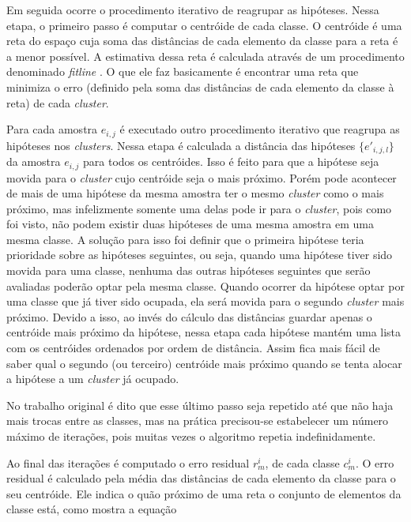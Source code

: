Em seguida ocorre o procedimento iterativo de reagrupar as hipóteses. Nessa etapa, o primeiro passo é computar o centróide de cada classe. O centróide é uma reta do espaço cuja soma das distâncias de cada elemento da classe para a reta é a menor possível. A estimativa dessa reta é calculada através de um procedimento denominado \emph{fitline} \cite{fitline_doc}. O que ele faz basicamente é encontrar uma reta que minimiza o erro (definido pela soma das distâncias de cada elemento da classe à reta) de cada \emph{cluster}.

Para cada amostra $e_{i,j}$ é executado outro procedimento iterativo que reagrupa as hipóteses nos \emph{clusters}. Nessa etapa é calculada a distância das hipóteses $\{e'_{i,j,l}\}$ da amostra $e_{i,j}$ para todos os centróides. Isso é feito para que a hipótese seja movida para o \emph{cluster} cujo centróide seja o mais próximo. Porém pode acontecer de mais de uma hipótese da mesma amostra ter o mesmo \emph{cluster} como o mais próximo, mas infelizmente somente uma delas pode ir para o \emph{cluster}, pois como foi visto, não podem existir duas hipóteses de uma mesma amostra em uma mesma classe. A solução para isso foi definir que o primeira hipótese teria prioridade sobre as hipóteses seguintes, ou seja, quando uma hipótese tiver sido movida para uma classe, nenhuma das outras hipóteses seguintes que serão avaliadas poderão optar pela mesma classe. Quando ocorrer da hipótese optar por uma classe que já tiver sido ocupada, ela será movida para o segundo \emph{cluster} mais próximo. Devido a isso, ao invés do cálculo das distâncias guardar apenas o centróide mais próximo da hipótese, nessa etapa cada hipótese mantém uma lista com os centróides ordenados por ordem de distância. Assim fica mais fácil de saber qual o segundo (ou terceiro) centróide mais próximo quando se tenta alocar a hipótese a um \emph{cluster} já ocupado.


No trabalho original \cite{celine} é dito que esse último passo seja repetido até que não haja mais trocas entre as classes, mas na prática precisou-se estabelecer um número máximo de iterações, pois muitas vezes o algoritmo repetia indefinidamente.


Ao final das iterações é computado o erro residual $r^i_m$, de cada classe $c^i_m$. O erro residual é calculado pela média das distâncias de cada elemento da classe para o seu centróide. Ele indica o quão próximo de uma reta o conjunto de elementos da classe está, como mostra a equação

